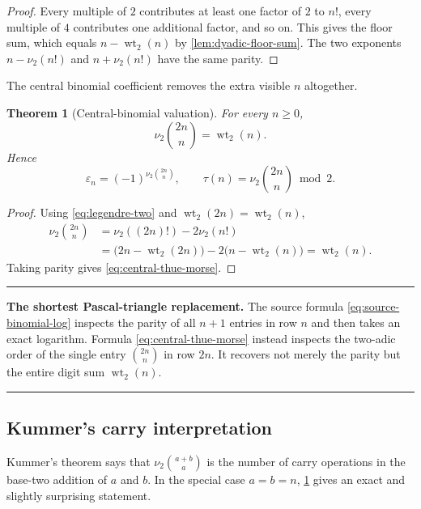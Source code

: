 \documentclass[11pt,oneside]{article}
\newtheorem{theorem}{Theorem}[section]
\theoremstyle{definition}
\theoremstyle{remark}
\newcommand{\wt}{\operatorname{wt}_2}
\newcommand{\vtwo}{\nu_2}
\newenvironment{boxedremark}{%
  \par\smallskip\noindent\begin{center}\begin{minipage}{0.94\textwidth}%
  \color{black}\hrule\vspace{0.6em}\small
}{%
  \vspace{0.6em}\hrule\end{minipage}\end{center}\smallskip
}
\begin{document}
\begin{proof}
Every multiple of $2$ contributes at least one factor of $2$ to $n!$, every
multiple of $4$ contributes one additional factor, and so on.  This gives the
floor sum, which equals $n-\wt(n)$ by \cref{lem:dyadic-floor-sum}.  The two
exponents $n-\vtwo(n!)$ and $n+\vtwo(n!)$ have the same parity.
\end{proof}

The central binomial coefficient removes the extra visible $n$ altogether.

\begin{theorem}[Central-binomial valuation]
\label{thm:central-binomial}
For every $n\ge0$,
\begin{equation}
  \boxed{\displaystyle
  \vtwo\binom{2n}{n}=\wt(n).}                               \label{eq:central-v2-weight}
\end{equation}
Hence
\begin{equation}
  \boxed{\displaystyle
  \varepsilon_n=(-1)^{\vtwo\binom{2n}{n}},
  \qquad
  \tau(n)=\vtwo\binom{2n}{n}\bmod2.}                      \label{eq:central-thue-morse}
\end{equation}
\end{theorem}

\begin{proof}
Using \eqref{eq:legendre-two} and $\wt(2n)=\wt(n)$,
\begin{align*}
 \vtwo\binom{2n}{n}
 &=\vtwo((2n)!)-2\vtwo(n!)\\
 &=\bigl(2n-\wt(2n)\bigr)-2\bigl(n-\wt(n)\bigr)
  =\wt(n).
\end{align*}
Taking parity gives \eqref{eq:central-thue-morse}.
\end{proof}

\begin{boxedremark}
\textbf{The shortest Pascal-triangle replacement.}
The source formula \eqref{eq:source-binomial-log} inspects the parity of all
$n+1$ entries in row $n$ and then takes an exact logarithm.  Formula
\eqref{eq:central-thue-morse} instead inspects the two-adic order of the single
entry $\binom{2n}{n}$ in row $2n$.  It recovers not merely the parity but the
entire digit sum $\wt(n)$.
\end{boxedremark}

\subsection{Kummer's carry interpretation}

Kummer's theorem says that $\vtwo\binom{a+b}{a}$ is the number of carry
operations in the base-two addition of $a$ and $b$.  In the special case $a=b=n$,
\cref{thm:central-binomial} gives an exact and slightly surprising statement.
\end{document}

